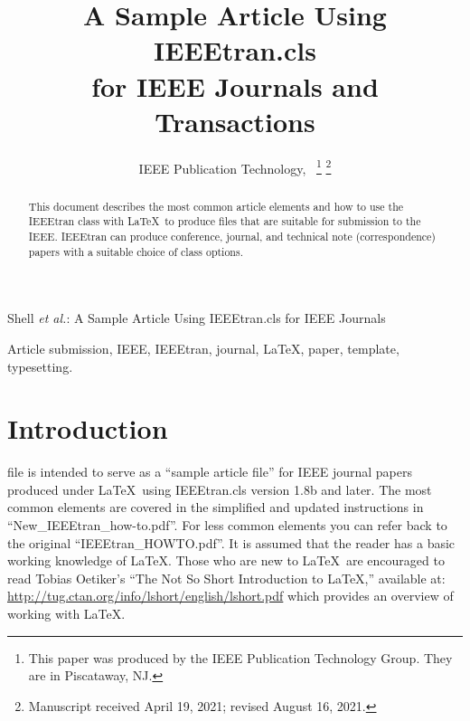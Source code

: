 \documentclass[]{IEEEtran}
\begin{document}
\title{A Sample Article Using IEEEtran.cls\\ for IEEE Journals and Transactions}

\author{IEEE Publication Technology,~
	\thanks{This paper was produced by the IEEE Publication Technology Group. They are in Piscataway, NJ.}%
	\thanks{Manuscript received April 19, 2021; revised August 16, 2021.}}

%
{Shell \MakeLowercase{\textit{et al.}}: A Sample Article Using IEEEtran.cls for IEEE Journals}


\maketitle

\begin{abstract}
	This document describes the most common article elements and how to use the IEEEtran class with \LaTeX \ to produce files that are suitable for submission to the IEEE.  IEEEtran can produce conference, journal, and technical note (correspondence) papers with a suitable choice of class options.
\end{abstract}

\begin{IEEEkeywords}
	Article submission, IEEE, IEEEtran, journal, \LaTeX, paper, template, typesetting.
\end{IEEEkeywords}

\section{Introduction}
 file is intended to serve as a ``sample article file''
for IEEE journal papers produced under \LaTeX\ using
IEEEtran.cls version 1.8b and later. The most common elements are covered in the simplified and updated instructions in ``New\_IEEEtran\_how-to.pdf''. For less common elements you can refer back to the original ``IEEEtran\_HOWTO.pdf''. It is assumed that the reader has a basic working knowledge of \LaTeX. Those who are new to \LaTeX \ are encouraged to read Tobias Oetiker's ``The Not So Short Introduction to \LaTeX ,'' available at: \url{http://tug.ctan.org/info/lshort/english/lshort.pdf} which provides an overview of working with \LaTeX.
\end{document}
